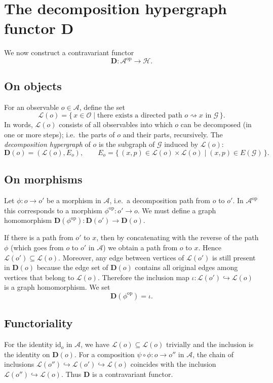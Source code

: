 \section{The decomposition hypergraph functor \(\mathbf{D}\)}\label{sec:functor}

We now construct a contravariant functor
\[
\mathbf{D} : \mathcal{A}^{\mathrm{op}} \longrightarrow \mathcal{H}.
\]

\subsection{On objects}
For an observable \(o \in \mathcal{A}\), define the set
\[
\mathcal{L}(o) = \{\, x \in \mathcal{O} \mid \text{there exists a directed path } o \rightsquigarrow x \text{ in } \mathcal{G} \,\}.
\]
In words, \(\mathcal{L}(o)\) consists of all observables into which \(o\) can be decomposed (in one or more steps); i.e.\ the parts of \(o\) and their parts, recursively.
The \emph{decomposition hypergraph} of \(o\) is the subgraph of \(\mathcal{G}\) induced by \(\mathcal{L}(o)\):
\[
\mathbf{D}(o) = (\mathcal{L}(o), E_o), \qquad
E_o = \{\, (x, p) \in \mathcal{L}(o) \times \mathcal{L}(o) \mid (x,p) \in E(\mathcal{G}) \,\}.
\]

\subsection{On morphisms}
Let \(\phi : o \to o'\) be a morphism in \(\mathcal{A}\), i.e.\ a decomposition path from \(o\) to \(o'\).
In \(\mathcal{A}^{\mathrm{op}}\) this corresponds to a morphism \(\phi^{\mathrm{op}} : o' \to o\).
We must define a graph homomorphism \(\mathbf{D}(\phi^{\mathrm{op}}) : \mathbf{D}(o') \to \mathbf{D}(o)\).

If there is a path from \(o'\) to \(x\), then by concatenating with the reverse of the path \(\phi\) (which goes from \(o\) to \(o'\) in \(\mathcal{A}\)) we obtain a path from \(o\) to \(x\). Hence \(\mathcal{L}(o') \subseteq \mathcal{L}(o)\).
Moreover, any edge between vertices of \(\mathcal{L}(o')\) is still present in \(\mathbf{D}(o)\) because the edge set of \(\mathbf{D}(o)\) contains all original edges among vertices that belong to \(\mathcal{L}(o)\).
Therefore the inclusion map \(\iota : \mathcal{L}(o') \hookrightarrow \mathcal{L}(o)\) is a graph homomorphism.
We set
\[
\mathbf{D}(\phi^{\mathrm{op}}) = \iota .
\]

\subsection{Functoriality}
For the identity \(\mathrm{id}_o\) in \(\mathcal{A}\), we have \(\mathcal{L}(o) \subseteq \mathcal{L}(o)\) trivially and the inclusion is the identity on \(\mathbf{D}(o)\).
For a composition \(\psi \circ \phi : o \to o''\) in \(\mathcal{A}\), the chain of inclusions \(\mathcal{L}(o'') \hookrightarrow \mathcal{L}(o') \hookrightarrow \mathcal{L}(o)\) coincides with the inclusion \(\mathcal{L}(o'') \hookrightarrow \mathcal{L}(o)\).
Thus \(\mathbf{D}\) is a contravariant functor.
